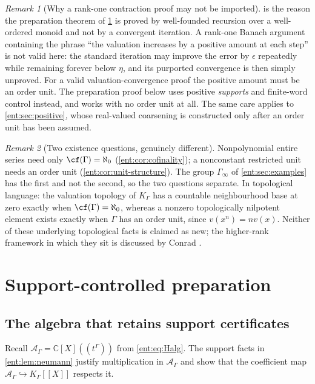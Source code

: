 \documentclass[11pt]{article}
\theoremstyle{plain}
\theoremstyle{plain}
\theoremstyle{plain}
\theoremstyle{definition}
\theoremstyle{definition}
\theoremstyle{definition}
\theoremstyle{definition}
\theoremstyle{remark}
\newtheorem{remark}[remark]{Remark}
\newcommand{\C}{\mathbb C}\newcommand{\R}{\mathbb R}
\newcommand{\K}{K_\Gamma}\newcommand{\KD}{K_\Delta}
\newcommand{\A}{\mathcal A_\Gamma}\newcommand{\OO}{\mathcal O_\Gamma}
\begin{document}
\begin{remark}[Why a rank-one contraction proof may not be imported]
\label{ent:rem:no-contraction}
 is the reason the preparation theorem of
\cref{ent:sec:prep} is proved by well-founded recursion over a well-ordered
monoid and not by a convergent iteration. A rank-one Banach argument
containing the phrase ``the valuation increases by a positive amount at each
step'' is not valid here: the standard iteration may improve the error by
$\epsilon$ repeatedly while remaining forever below $\eta$, and its purported
convergence is then simply unproved. For a valid valuation-convergence proof
the positive amount must be an order unit. The preparation proof below uses
positive \emph{supports} and finite-word control instead, and works with no
order unit at all. The same care applies to \cref{ent:sec:positive}, whose
real-valued coarsening is constructed only after an order unit has been
assumed.
\end{remark}

\begin{remark}[Two existence questions, genuinely different]
\label{ent:rem:two-existence}
Nonpolynomial entire series need only $\cf(\Gamma)=\aleph_0$
(\cref{ent:cor:cofinality}); a nonconstant restricted unit needs an order
unit (\cref{ent:cor:unit-structure}). The group $\Gamma_\infty$ of
\cref{ent:sec:examples} has the first and not the second, so the two
questions separate. In topological language: the valuation topology of $\K$
has a countable neighbourhood base at zero exactly when
$\cf(\Gamma)=\aleph_0$, whereas a nonzero topologically nilpotent element
exists exactly when $\Gamma$ has an order unit, since $v(x^n)=nv(x)$. Neither
of these underlying topological facts is claimed as new; the higher-rank
framework in which they sit is discussed by Conrad \cite{Conrad}.
\end{remark}

\section{Support-controlled preparation}
\label{ent:sec:prep}

\subsection{The algebra that retains support certificates}
Recall $\A=\C[X]((t^\Gamma))$ from \eqref{ent:eq:Halg}. The support facts in
\cref{ent:lem:neumann} justify multiplication in $\A$ and show that the
coefficient map $\A\hookrightarrow\K[[X]]$ respects it.
\end{document}
